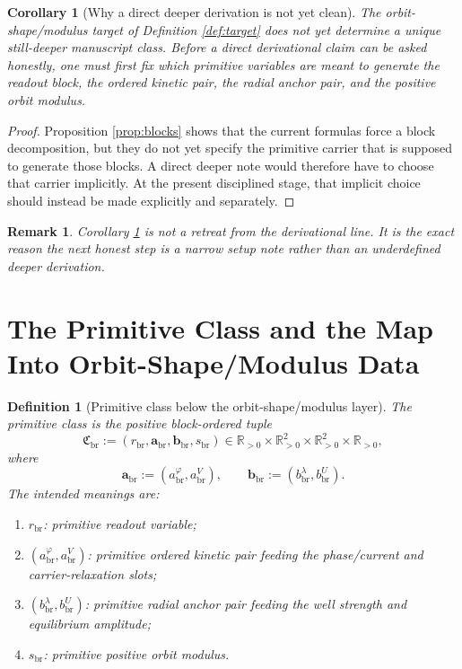 \documentclass[11pt]{article}
\newcommand{\ScaleMod}{s_{\mathrm{br}}}
\newcommand{\PrimClass}{\mathfrak C_{\mathrm{br}}}
\newcommand{\PrimRead}{r_{\mathrm{br}}}
\newcommand{\PrimCovSlot}{a_{\mathrm{br}}^{\varphi}}
\newcommand{\PrimRelaxSlot}{a_{\mathrm{br}}^{V}}
\newcommand{\PrimKinetic}{\bm a_{\mathrm{br}}}
\newcommand{\PrimWellSlot}{b_{\mathrm{br}}^{\lambda}}
\newcommand{\PrimEqSlot}{b_{\mathrm{br}}^{U}}
\newcommand{\PrimAnchor}{\bm b_{\mathrm{br}}}
\newtheorem{definition}{Definition}
\newtheorem{remark}{Remark}
\newtheorem{corollary}{Corollary}
\begin{document}
\begin{corollary}[Why a direct deeper derivation is not yet clean]
\label{cor:needsetup}
The orbit-shape/modulus target of Definition \ref{def:target} does not yet determine a unique still-deeper manuscript class. Before a direct derivational claim can be asked honestly, one must first fix which primitive variables are meant to generate the readout block, the ordered kinetic pair, the radial anchor pair, and the positive orbit modulus.
\end{corollary}

\begin{proof}
Proposition \ref{prop:blocks} shows that the current formulas force a block decomposition, but they do not yet specify the primitive carrier that is supposed to generate those blocks. A direct deeper note would therefore have to choose that carrier implicitly. At the present disciplined stage, that implicit choice should instead be made explicitly and separately.
\end{proof}

\begin{remark}
Corollary \ref{cor:needsetup} is not a retreat from the derivational line. It is the exact reason the next honest step is a narrow setup note rather than an underdefined deeper derivation.
\end{remark}

\section{The Primitive Class and the Map Into Orbit-Shape/Modulus Data}

\begin{definition}[Primitive class below the orbit-shape/modulus layer]
\label{def:primclass}
The \emph{primitive class} is the positive block-ordered tuple
\begin{equation}
\PrimClass
:=
(\PrimRead,\PrimKinetic,\PrimAnchor,\ScaleMod)
\in
\mathbb R_{>0}\times\mathbb R_{>0}^2\times\mathbb R_{>0}^2\times\mathbb R_{>0},
\label{eq:primclass}
\end{equation}
where
\begin{equation}
\PrimKinetic
:=
(\PrimCovSlot,\PrimRelaxSlot),
\qquad
\PrimAnchor
:=
(\PrimWellSlot,\PrimEqSlot).
\label{eq:blocks}
\end{equation}
The intended meanings are:
\begin{enumerate}
    \item \(\PrimRead\): primitive readout variable;
    \item \((\PrimCovSlot,\PrimRelaxSlot)\): primitive ordered kinetic pair feeding the phase/current and carrier-relaxation slots;
    \item \((\PrimWellSlot,\PrimEqSlot)\): primitive radial anchor pair feeding the well strength and equilibrium amplitude;
    \item \(\ScaleMod\): primitive positive orbit modulus.
\end{enumerate}
\end{definition}
\end{document}
